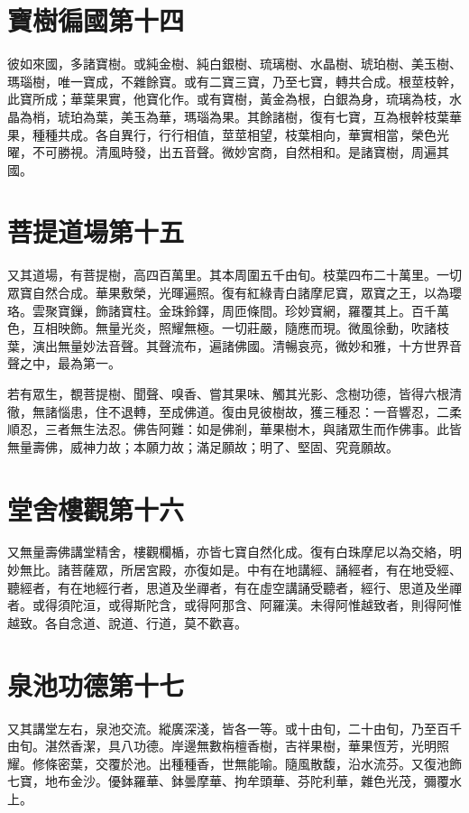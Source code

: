 \documentclass{zhvt-classic}
\begin{document}
\chapter*{寶樹徧國第十四}

彼如來國，多諸寶樹。或純金樹、純白銀樹、琉璃樹、水晶樹、琥珀樹、美玉樹、瑪瑙樹，唯一寶成，不雜餘寶。或有二寶三寶，乃至七寶，轉共合成。根莖枝幹，此寶所成；華葉果實，他寶化作。或有寶樹，黃金為根，白銀為身，琉璃為枝，水晶為梢，琥珀為葉，美玉為華，瑪瑙為果。其餘諸樹，復有七寶，互為根幹枝葉華果，種種共成。各自異行，行行相值，莖莖相望，枝葉相向，華實相當，榮色光曜，不可勝視。清風時發，出五音聲。微妙宮商，自然相和。是諸寶樹，周遍其國。

\chapter*{菩提道場第十五}

又其道場，有菩提樹，高四百萬里。其本周圍五千由旬。枝葉四布二十萬里。一切眾寶自然合成。華果敷榮，光暉遍照。復有紅綠青白諸摩尼寶，眾寶之王，以為瓔珞。雲聚寶鏁，飾諸寶柱。金珠鈴鐸，周匝條間。珍妙寶網，羅覆其上。百千萬色，互相映飾。無量光炎，照耀無極。一切莊嚴，隨應而現。微風徐動，吹諸枝葉，演出無量妙法音聲。其聲流布，遍諸佛國。清暢哀亮，微妙和雅，十方世界音聲之中，最為第一。

若有眾生，覩菩提樹、聞聲、嗅香、嘗其果味、觸其光影、念樹功德，皆得六根清徹，無諸惱患，住不退轉，至成佛道。復由見彼樹故，獲三種忍：一音響忍，二柔順忍，三者無生法忍。佛告阿難：如是佛剎，華果樹木，與諸眾生而作佛事。此皆無量壽佛，威神力故；本願力故；滿足願故；明了、堅固、究竟願故。

\chapter*{堂舍樓觀第十六}

又無量壽佛講堂精舍，樓觀欄楯，亦皆七寶自然化成。復有白珠摩尼以為交絡，明妙無比。諸菩薩眾，所居宮殿，亦復如是。中有在地講經、誦經者，有在地受經、聽經者，有在地經行者，思道及坐禪者，有在虛空講誦受聽者，經行、思道及坐禪者。或得須陀洹，或得斯陀含，或得阿那含、阿羅漢。未得阿惟越致者，則得阿惟越致。各自念道、說道、行道，莫不歡喜。

\chapter*{泉池功德第十七}

又其講堂左右，泉池交流。縱廣深淺，皆各一等。或十由旬，二十由旬，乃至百千由旬。湛然香潔，具八功德。岸邊無數栴檀香樹，吉祥果樹，華果恆芳，光明照耀。修條密葉，交覆於池。出種種香，世無能喻。隨風散馥，沿水流芬。又復池飾七寶，地布金沙。優鉢羅華、鉢曇摩華、拘牟頭華、芬陀利華，雜色光茂，彌覆水上。
\end{document}

